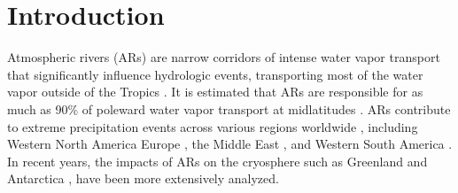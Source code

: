 \documentclass[12pts,draft]{AR_analysis_}
\begin{document}
%
%

%


%
%
%
%



\section{Introduction}

Atmospheric rivers (ARs) are narrow corridors of intense water vapor
transport that significantly influence hydrologic events, transporting
most of the water vapor outside of the Tropics \cite{AR_def}.
It is estimated that ARs are responsible for as much as 90\% of poleward
water vapor transport at midlatitudes \cite{other_alg}. ARs contribute to
extreme precipitation events across various regions worldwide 
\cite{Espinoza2018, Massoud2019}, including
Western North America \cite{Dettinger2004, Neiman2008, Guan2010,
ARs_flood_WA_State, ARs_flood_Russian_River_CA, Ralph2013, ARs_CA}
Europe \cite{Lavers2013, ARs_impact_Norway}, the Middle East \cite{massoud2020, 
Lashkari2020,  Esfandiari2024}, and Western South America
\cite{ARs_impact_SA}. In recent years, the impacts of ARs on the cryosphere
such as Greenland \cite{Mattingly2018} and Antarctica \cite{Gorodetskaya2014, 
Wille2021}, have been more extensively analyzed. 
\end{document}
